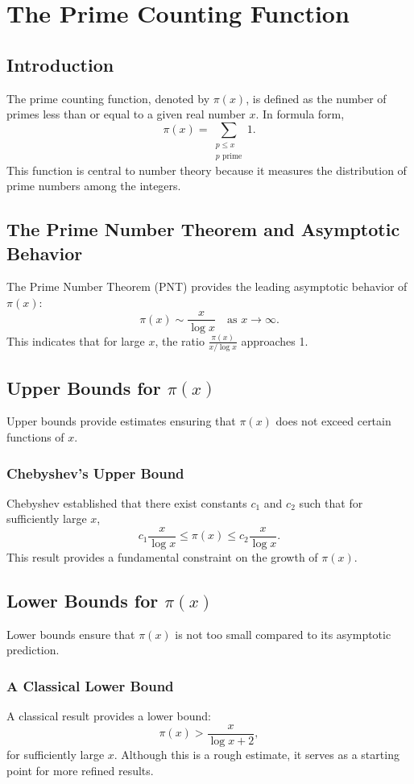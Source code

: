 \chapter{The Prime Counting Function}
\label{chap:prime_counting_function}

\section{Introduction}
The prime counting function, denoted by $\pi(x)$, is defined as the number of primes less than or equal to a given real number $x$. In formula form,
\[
\pi(x) = \sum_{\substack{p \le x \\ p \text{ prime}}} 1.
\]
This function is central to number theory because it measures the distribution of prime numbers among the integers.

\section{The Prime Number Theorem and Asymptotic Behavior}
The Prime Number Theorem (PNT) provides the leading asymptotic behavior of $\pi(x)$:
\[
\pi(x) \sim \frac{x}{\log x} \quad \text{as } x \to \infty.
\]
This indicates that for large $x$, the ratio $\frac{\pi(x)}{x/\log x}$ approaches 1.

\section{Upper Bounds for $\pi(x)$}
Upper bounds provide estimates ensuring that $\pi(x)$ does not exceed certain functions of $x$.

\subsection{Chebyshev's Upper Bound}
Chebyshev established that there exist constants \(c_1\) and \(c_2\) such that for sufficiently large \(x\),
\[
c_1 \frac{x}{\log x} \leq \pi(x) \leq c_2 \frac{x}{\log x}.
\]
This result provides a fundamental constraint on the growth of $\pi(x)$.

\section{Lower Bounds for $\pi(x)$}
Lower bounds ensure that $\pi(x)$ is not too small compared to its asymptotic prediction.

\subsection{A Classical Lower Bound}
A classical result provides a lower bound:
\[
\pi(x) > \frac{x}{\log x + 2},
\]
for sufficiently large $x$. Although this is a rough estimate, it serves as a starting point for more refined results.

